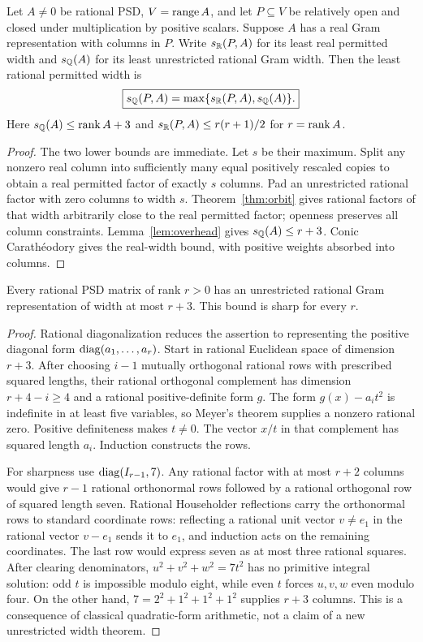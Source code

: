 \begin{theorem}\label{thm:width}
Let $A\ne0$ be rational PSD, $V=\operatorname{range} A$, and let $P\subseteq V$ be relatively open and closed under multiplication by positive scalars. Suppose $A$ has a real Gram representation with columns in $P$. Write $s_\mathbb R(P,A)$ for its least real permitted width and $s_\mathbb Q(A)$ for its least unrestricted rational Gram width. Then the least rational permitted width is
\[
 \boxed{s_\mathbb Q(P,A)=\max\{s_\mathbb R(P,A),s_\mathbb Q(A)\}.}
\]
Here $s_\mathbb Q(A)\leq\operatorname{rank} A+3$ and $s_\mathbb R(P,A)\leq r(r+1)/2$ for $r=\operatorname{rank} A$.
\end{theorem}
\begin{proof}
The two lower bounds are immediate. Let $s$ be their maximum. Split any nonzero real column into sufficiently many equal positively rescaled copies to obtain a real permitted factor of exactly $s$ columns. Pad an unrestricted rational factor with zero columns to width $s$. Theorem~\ref{thm:orbit} gives rational factors of that width arbitrarily close to the real permitted factor; openness preserves all column constraints. Lemma~\ref{lem:overhead} gives $s_\mathbb Q(A)\leq r+3$. Conic Carath\'eodory gives the real-width bound, with positive weights absorbed into columns.
\end{proof}
\begin{lemma}\label{lem:overhead}
Every rational PSD matrix of rank $r>0$ has an unrestricted rational Gram representation of width at most $r+3$. This bound is sharp for every $r$.
\end{lemma}
\begin{proof}
Rational diagonalization reduces the assertion to representing the positive diagonal form $\operatorname{diag}(a_1,\ldots,a_r)$. Start in rational Euclidean space of dimension $r+3$. After choosing $i-1$ mutually orthogonal rational rows with prescribed squared lengths, their rational orthogonal complement has dimension $r+4-i\geq4$ and a rational positive-definite form $g$. The form $g(x)-a_it^2$ is indefinite in at least five variables, so Meyer's theorem supplies a nonzero rational zero. Positive definiteness makes $t\ne0$. The vector $x/t$ in that complement has squared length $a_i$. Induction constructs the rows.

For sharpness use $\operatorname{diag}(I_{r-1},7)$. Any rational factor with at most $r+2$ columns would give $r-1$ rational orthonormal rows followed by a rational orthogonal row of squared length seven. Rational Householder reflections carry the orthonormal rows to standard coordinate rows: reflecting a rational unit vector $v\ne e_1$ in the rational vector $v-e_1$ sends it to $e_1$, and induction acts on the remaining coordinates. The last row would express seven as at most three rational squares. After clearing denominators, $u^2+v^2+w^2=7t^2$ has no primitive integral solution: odd $t$ is impossible modulo eight, while even $t$ forces $u,v,w$ even modulo four. On the other hand, $7=2^2+1^2+1^2+1^2$ supplies $r+3$ columns. This is a consequence of classical quadratic-form arithmetic, not a claim of a new unrestricted width theorem.
\end{proof}
